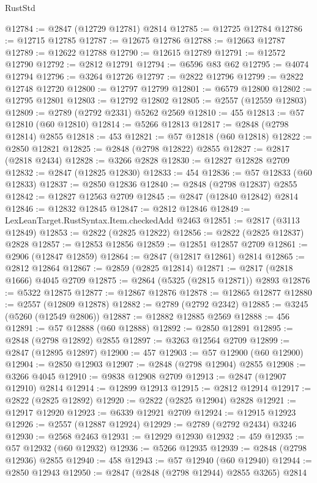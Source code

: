 \begin{lexlean}{RustStd}
\begin{coremodule}
@12784 := @2847 (@12729 @12781) @2814
@12785 := @12725 @12784
@12786 := @12715 @12785
@12787 := @12675 @12786
@12788 := @12663 @12787
@12789 := @12622 @12788
@12790 := @12615 @12789
@12791 := @12572 @12790
@12792 := @2812 @12791
@12794 := @6596 @83 @62
@12795 := @4074 @12794
@12796 := @3264 @12726
@12797 := @2822 @12796
@12799 := @2822 @12748 @12720
@12800 := @12797 @12799
@12801 := @6579 @12800
@12802 := @12795 @12801
@12803 := @12792 @12802
@12805 := @2557 (@12559 @12803)
@12809 := @2789 (@2792 @2331) @5262 @2569
@12810 := 455
@12813 := @57 @12810 (@60 @12810)
@12814 := @5266 @12813
@12817 := @2848 (@2798 @12814) @2855
@12818 := 453
@12821 := @57 @12818 (@60 @12818)
@12822 := @2850 @12821
@12825 := @2848 (@2798 @12822) @2855
@12827 := @2817 (@2818 @2434)
@12828 := @3266 @2828
@12830 := @12827 @12828 @2709
@12832 := @2847 (@12825 @12830)
@12833 := 454
@12836 := @57 @12833 (@60 @12833)
@12837 := @2850 @12836
@12840 := @2848 (@2798 @12837) @2855
@12842 := @12827 @12563 @2709
@12845 := @2847 (@12840 @12842) @2814
@12846 := @12832 @12845
@12847 := @2812 @12846
@12849 := LexLeanTarget.RustSyntax.Item.checkedAdd @2463
@12851 := @2817 (@3113 @12849)
@12853 := @2822 (@2825 @12822)
@12856 := @2822 (@2825 @12837) @2828
@12857 := @12853 @12856
@12859 := @12851 @12857 @2709
@12861 := @2906 (@12847 @12859)
@12864 := @2847 (@12817 @12861) @2814
@12865 := @2812 @12864
@12867 := @2859 (@2825 @12814)
@12871 := @2817 (@2818 @1666) @4045 @2709
@12875 := @2864 (@5325 (@2815 @12871)) @2893
@12876 := @5322 @12875
@12877 := @12867 @12876
@12878 := @12865 @12877
@12880 := @2557 (@12809 @12878)
@12882 := @2789 (@2792 @2342)
@12885 := @3245 (@5260 (@12549 @2806))
@12887 := @12882 @12885 @2569
@12888 := 456
@12891 := @57 @12888 (@60 @12888)
@12892 := @2850 @12891
@12895 := @2848 (@2798 @12892) @2855
@12897 := @3263 @12564 @2709
@12899 := @2847 (@12895 @12897)
@12900 := 457
@12903 := @57 @12900 (@60 @12900)
@12904 := @2850 @12903
@12907 := @2848 (@2798 @12904) @2855
@12908 := @3266 @4045
@12910 := @9838 @12908 @2709
@12913 := @2847 (@12907 @12910) @2814
@12914 := @12899 @12913
@12915 := @2812 @12914
@12917 := @2822 (@2825 @12892)
@12920 := @2822 (@2825 @12904) @2828
@12921 := @12917 @12920
@12923 := @6339 @12921 @2709
@12924 := @12915 @12923
@12926 := @2557 (@12887 @12924)
@12929 := @2789 (@2792 @2434) @3246
@12930 := @2568 @2463
@12931 := @12929 @12930
@12932 := 459
@12935 := @57 @12932 (@60 @12932)
@12936 := @5266 @12935
@12939 := @2848 (@2798 @12936) @2855
@12940 := 458
@12943 := @57 @12940 (@60 @12940)
@12944 := @2850 @12943
@12950 := @2847 (@2848 (@2798 @12944) @2855 @3265) @2814

\end{coremodule}
\end{lexlean}
